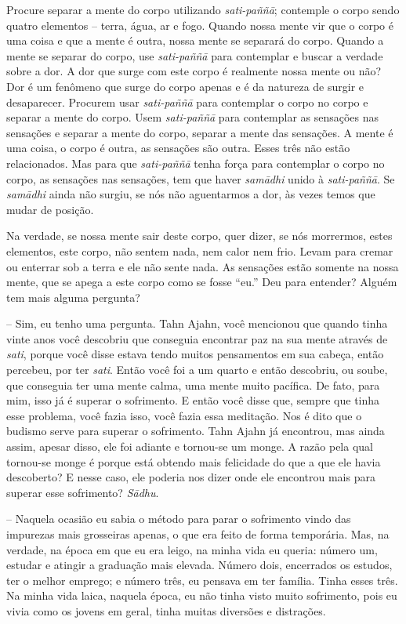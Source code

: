 Procure separar a mente do corpo utilizando \textit{sati-paññā};
contemple o corpo sendo quatro elementos – terra, água, ar e fogo.
Quando nossa mente vir que o corpo é uma coisa e que a mente é outra,
nossa mente se separará do corpo. Quando a mente se separar do corpo,
use \textit{sati-paññā} para contemplar e buscar a verdade sobre a
dor. A dor que surge com este corpo é realmente nossa mente ou não? Dor
é um fenômeno que surge do corpo apenas e é da natureza de surgir e
desaparecer. Procurem usar \textit{sati-paññā} para contemplar o
corpo no corpo e separar a mente do corpo. Usem \textit{sati-paññā
}para contemplar as sensações nas sensações e separar a mente do corpo,
separar a mente das sensações. A mente é uma coisa, o corpo é outra, as
sensações são outra. Esses três não estão relacionados. Mas para que
\textit{sati-paññā} tenha força para contemplar o corpo no corpo, as
sensações nas sensações, tem que haver \textit{samādhi} unido à
\textit{sati-paññā}. Se \textit{samādhi} ainda não surgiu, se nós
não aguentarmos a dor, às vezes temos que mudar de posição.

Na verdade, se nossa mente sair deste corpo, quer dizer, se nós
morrermos, estes elementos, este corpo, não sentem nada, nem calor nem
frio. Levam para cremar ou enterrar sob a terra e ele não sente nada.
As sensações estão somente na nossa mente, que se apega a este corpo
como se fosse “eu.” Deu para entender? Alguém tem mais alguma pergunta?

-- Sim, eu tenho uma pergunta. Tahn Ajahn, você mencionou que
quando tinha vinte anos você descobriu que conseguia encontrar paz na
sua mente através de \textit{sati}, porque você disse estava tendo
muitos pensamentos em sua cabeça, então percebeu, por ter
\textit{sati}. Então você foi a um quarto e então descobriu, ou soube,
que conseguia ter uma mente calma, uma mente muito pacífica. De fato,
para mim, isso já é superar o sofrimento. E então você disse que,
sempre que tinha esse problema, você fazia isso, você fazia essa
meditação. Nos é dito que o budismo serve para superar o sofrimento.
Tahn Ajahn já encontrou, mas ainda assim, apesar disso, ele
foi adiante e tornou-se um monge. A razão pela qual tornou-se monge é
porque está obtendo mais felicidade do que a que ele havia descoberto?
E nesse caso, ele poderia nos dizer onde ele encontrou mais para
superar esse sofrimento? \textit{Sādhu}.

-- Naquela ocasião eu sabia o método para parar o sofrimento vindo
das impurezas mais grosseiras apenas, o que era feito de forma
temporária. Mas, na verdade, na época em que eu era leigo, na minha
vida eu queria: número um, estudar e atingir a graduação mais elevada.
Número dois, encerrados os estudos, ter o melhor emprego; e número
três, eu pensava em ter família. Tinha esses três. Na minha vida laica,
naquela época, eu não tinha visto muito sofrimento, pois eu vivia como
os jovens em geral, tinha muitas diversões e distrações.

